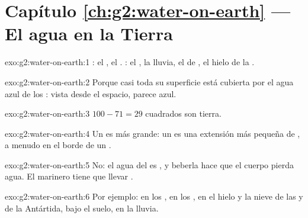 \section*{Capítulo \ref{ch:g2:water-on-earth} --- El agua en la Tierra}

\begin{solution}{exo:g2:water-on-earth:1}
: el , el . : el , la lluvia, el  de
, el hielo de la .
\end{solution}

\begin{solution}{exo:g2:water-on-earth:2}
Porque casi toda su superficie está cubierta por el agua azul de los
: vista desde el espacio, parece azul.
\end{solution}

\begin{solution}{exo:g2:water-on-earth:3}
$100 - 71 = 29$ cuadrados son tierra.
\end{solution}

\begin{solution}{exo:g2:water-on-earth:4}
Un  es más grande: un  es una extensión más pequeña de , a menudo en el borde de un .
\end{solution}

\begin{solution}{exo:g2:water-on-earth:5}
No: el agua del  es , y beberla hace que el cuerpo pierda
agua. El marinero tiene que llevar .
\end{solution}

\begin{solution}{exo:g2:water-on-earth:6}
Por ejemplo: en los , en los , en el hielo y la nieve de las
 y de la Antártida, bajo el suelo, en la lluvia.
\end{solution}

